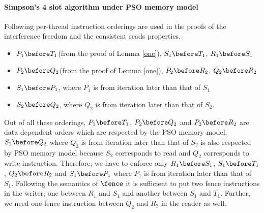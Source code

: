 \paragraph{\textbf{Simpson's 4 slot algorithm under PSO memory model}}
Following per-thread instruction orderings are used in the proofs of the interference freedom and the consistent reads properties.
\begin{itemize}
 \item $P_1\before T_1$(from the proof of Lemma \ref{one}), $S_1 \before T_1$, $R_1\before S_1$
 \item $P_2\before Q_2$(from the proof of Lemma \ref{one}), $P_2\before R_2$, $Q_2\before R_2$
 \item $S_1\before P_1$, where $P_1$ is from iteration later than that of $S_1$
 \item $S_2 \before Q_2$, where $Q_2$ is from iteration later than that of $S_2$.
\end{itemize}
Out of all these orderings, $P_1\before T_1$, $P_2\before Q_2$ and $P_2\before R_2$ are data dependent orders which are respected by the PSO memory model. 
$S_2\before Q_2$ where $Q_2$ is from iteration later than that of $S_2$ is also respected by PSO memory model because $S_2$ corresponds to read and $Q_2$ 
corresponds to write instruction. Therefore, we have to enforce only $R_1\before S_1$, $S_1\before T_1$, $Q_2\before R_2$ and $S_1\before P_1$ where $P_1$ is 
from iteration later than that of $S_1$. Following the semantics of $\fence$ it is sufficient to put two fence instructions in the writer; one between $R_1$ and $S_1$ 
and another between $S_1$ and $T_1$. Further, we need one fence instruction between $Q_2$ and $R_2$ in the reader as well. 
